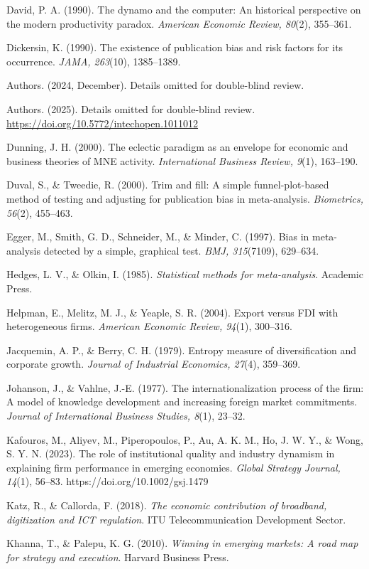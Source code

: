 \documentclass[
  12pt,a4paper]{article}
\begin{document}
David, P. A. (1990). The dynamo and the computer: An historical
perspective on the modern productivity paradox. \emph{American Economic
Review, 80}(2), 355--361.

Dickersin, K. (1990). The existence of publication bias and risk factors
for its occurrence. \emph{JAMA, 263}(10), 1385--1389.

Authors. (2024, December). Details omitted for double-blind review.

Authors. (2025). Details omitted for double-blind review.
\url{https://doi.org/10.5772/intechopen.1011012}

Dunning, J. H. (2000). The eclectic paradigm as an envelope for economic
and business theories of MNE activity. \emph{International Business
Review, 9}(1), 163--190.

Duval, S., \& Tweedie, R. (2000). Trim and fill: A simple
funnel-plot-based method of testing and adjusting for publication bias
in meta-analysis. \emph{Biometrics, 56}(2), 455--463.

Egger, M., Smith, G. D., Schneider, M., \& Minder, C. (1997). Bias in
meta-analysis detected by a simple, graphical test. \emph{BMJ,
315}(7109), 629--634.

Hedges, L. V., \& Olkin, I. (1985). \emph{Statistical methods for
meta-analysis}. Academic Press.

Helpman, E., Melitz, M. J., \& Yeaple, S. R. (2004). Export versus FDI
with heterogeneous firms. \emph{American Economic Review, 94}(1),
300--316.

Jacquemin, A. P., \& Berry, C. H. (1979). Entropy measure of
diversification and corporate growth. \emph{Journal of Industrial
Economics, 27}(4), 359--369.

Johanson, J., \& Vahlne, J.-E. (1977). The internationalization process
of the firm: A model of knowledge development and increasing foreign
market commitments. \emph{Journal of International Business Studies,
8}(1), 23--32.

Kafouros, M., Aliyev, M., Piperopoulos, P., Au, A. K. M., Ho, J. W. Y.,
\& Wong, S. Y. N. (2023). The role of institutional quality and industry
dynamism in explaining firm performance in emerging economies.
\emph{Global Strategy Journal, 14}(1), 56--83.
https://doi.org/10.1002/gsj.1479

Katz, R., \& Callorda, F. (2018). \emph{The economic contribution of
broadband, digitization and ICT regulation}. ITU Telecommunication
Development Sector.

Khanna, T., \& Palepu, K. G. (2010). \emph{Winning in emerging markets:
A road map for strategy and execution}. Harvard Business Press.
\end{document}
